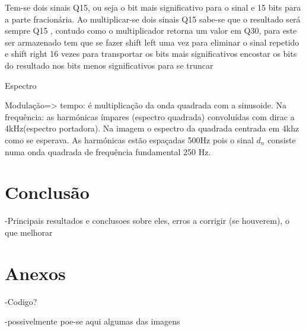 \documentclass[11pt]{article}
\begin{document}
Tem-se dois sinais Q15, ou seja o bit mais significativo para o sinal e 15 bits para a parte fracionária. Ao multiplicar-se dois sinais Q15 sabe-se que o resultado será sempre Q15
, contudo como o multiplicador retorna um valor em Q30, para este ser armazenado tem que se fazer shift left uma vez para eliminar o sinal repetido e shift right 16 vezes para transportar os bits mais significativos encostar os bits do resultado nos bits menos significativos para se truncar




Espectro

Modulação=> tempo: é multiplicação da onda quadrada com a sinusoide. Na frequência: as harmónicas ímpares (espectro quadrada) convoluídas com dirac a 4kHz(espectro portadora).
Na imagem o espectro da quadrada centrada em 4khz como se esperava. As harmónicas estão espaçadas 500Hz pois o sinal $d_n$ consiste numa onda quadrada de frequência fundamental 250 Hz.


\section{Conclusão}
-Principais resultados e conclusoes sobre eles, erros a corrigir (se houverem), o que melhorar

\section{Anexos}
-Codigo?

-possivelmente poe-se aqui algumas das imagens	
\end{document}
